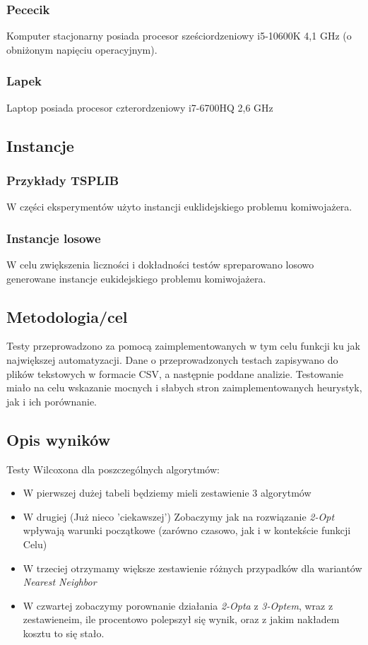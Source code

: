 \documentclass{article}
\begin{document}
\subsubsection{Pececik}
Komputer stacjonarny posiada procesor sześciordzeniowy i5-10600K 4,1 GHz (o obniżonym napięciu operacyjnym).
\subsubsection{Lapek}
Laptop posiada procesor czterordzeniowy i7-6700HQ 2,6 GHz

\subsection{Instancje}
\subsubsection{Przykłady TSPLIB}
W części eksperymentów użyto instancji euklidejskiego problemu komiwojażera.

\subsubsection{Instancje losowe}
W celu zwiększenia liczności i dokładności testów spreparowano losowo generowane instancje eukidejskiego problemu komiwojażera.

\subsection{Metodologia/cel}

Testy przeprowadzono za pomocą zaimplementowanych w tym celu funkcji ku jak największej automatyzacji. Dane o przeprowadzonych testach zapisywano do plików tekstowych w formacie CSV, a następnie poddane analizie. Testowanie miało na celu wskazanie mocnych i słabych stron zaimplementowanych heurystyk, jak i ich porównanie.

\subsection{Opis wyników}
Testy Wilcoxona dla poszczególnych algorytmów:
\begin{itemize}
	\item W pierwszej dużej tabeli będziemy mieli zestawienie 3 algorytmów
	\item W drugiej (Już nieco 'ciekawszej') Zobaczymy jak na rozwiązanie \textit{2-Opt} wpływają warunki początkowe (zarówno czasowo, jak i w kontekście funkcji Celu)
	\item W trzeciej otrzymamy większe zestawienie różnych przypadków dla wariantów \textit{Nearest Neighbor}
	\item W czwartej zobaczymy porownanie działania \textit{2-Opta} z \textit{3-Optem}, wraz z zestawieneim, ile procentowo polepszył się wynik, oraz z jakim nakładem kosztu to się stało.
\end{itemize}
\end{document}

